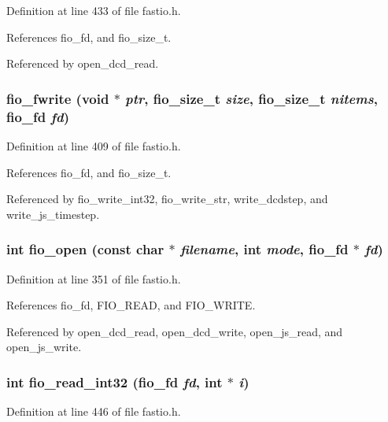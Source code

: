 Definition at line 433 of file fastio.h.

References fio\_\-fd, and fio\_\-size\_\-t.

Referenced by open\_\-dcd\_\-read.
\subsubsection{ fio\_\-fwrite (void $\ast$ {\em ptr}, {\bf fio\_\-size\_\-t} {\em size}, {\bf fio\_\-size\_\-t} {\em nitems}, {\bf fio\_\-fd} {\em fd})\hspace{0.3cm}{\tt  [static]}}\label{fastio_8h_a12}




Definition at line 409 of file fastio.h.

References fio\_\-fd, and fio\_\-size\_\-t.

Referenced by fio\_\-write\_\-int32, fio\_\-write\_\-str, write\_\-dcdstep, and write\_\-js\_\-timestep.
\subsubsection{\setlength{\rightskip}{0pt plus 5cm}int fio\_\-open (const char $\ast$ {\em filename}, int {\em mode}, {\bf fio\_\-fd} $\ast$ {\em fd})\hspace{0.3cm}{\tt  [static]}}\label{fastio_8h_a8}




Definition at line 351 of file fastio.h.

References fio\_\-fd, FIO\_\-READ, and FIO\_\-WRITE.

Referenced by open\_\-dcd\_\-read, open\_\-dcd\_\-write, open\_\-js\_\-read, and open\_\-js\_\-write.
\subsubsection{\setlength{\rightskip}{0pt plus 5cm}int fio\_\-read\_\-int32 ({\bf fio\_\-fd} {\em fd}, int $\ast$ {\em i})\hspace{0.3cm}{\tt  [static]}}\label{fastio_8h_a16}




Definition at line 446 of file fastio.h.


